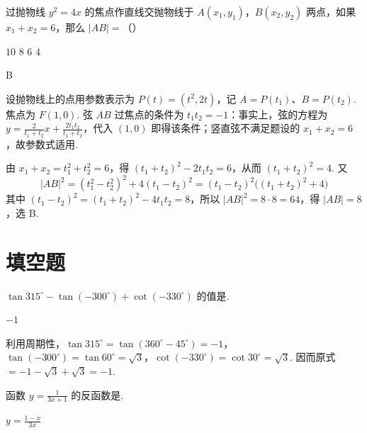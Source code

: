\begin{problem}
过抛物线 \(y^2=4x\) 的焦点作直线交抛物线于 \(A(x_1,y_1)\)，\(B(x_2,y_2)\) 两点，如果 \(x_1+x_2=6\)，那么 \(|AB|=\)（\quad）

\choices
    {\(10\)}
    {\(8\)}
    {\(6\)}
    {\(4\)}
\end{problem}

\begin{answer}
B
\end{answer}

\begin{solution}
设抛物线上的点用参数表示为 \(P(t)=(t^2,2t)\)，记 \(A=P(t_1)\)、\(B=P(t_2)\). 焦点为 \(F(1,0)\). 弦 \(AB\) 过焦点的条件为 \(t_1t_2=-1\)：事实上，弦的方程为 \(y=\frac{2}{t_1+t_2}x+\frac{2t_1t_2}{t_1+t_2}\)，代入 \((1,0)\) 即得该条件；竖直弦不满足题设的 \(x_1+x_2=6\)，故参数式适用.

由 \(x_1+x_2=t_1^2+t_2^2=6\)，得 \((t_1+t_2)^2-2t_1t_2=6\)，从而 \((t_1+t_2)^2=4\). 又
\[
|AB|^2=(t_1^2-t_2^2)^2+4(t_1-t_2)^2=(t_1-t_2)^2\bigl((t_1+t_2)^2+4\bigr)
\]
其中 \((t_1-t_2)^2=(t_1+t_2)^2-4t_1t_2=8\)，所以 \(|AB|^2=8\cdot8=64\)，得 \(|AB|=8\)，选 B.
\end{solution}

\section{填空题}

\begin{problem}

\(\tan 315^\circ - \tan(-300^\circ) + \cot(-330^\circ)\) 的值是\fillinblank{}.
\end{problem}

\begin{answer}
\(-1\)
\end{answer}

\begin{solution}
利用周期性，\(\tan315^\circ=\tan(360^\circ-45^\circ)=-1\)，\(\tan(-300^\circ)=\tan60^\circ=\sqrt3\)，\(\cot(-330^\circ)=\cot30^\circ=\sqrt3\). 因而原式 \(=-1-\sqrt3+\sqrt3=-1\).
\end{solution}

\begin{problem}

函数 \(y = \frac{1}{3x + 1}\) 的反函数是\fillinblank{}.
\end{problem}

\begin{answer}
\(y = \frac{1 - x}{3x}\)
\end{answer}

